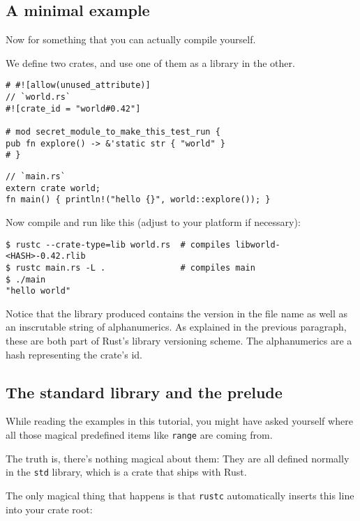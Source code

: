 \documentclass[]{article}
\begin{document}
\subsection{A minimal example}\label{a-minimal-example}

Now for something that you can actually compile yourself.

We define two crates, and use one of them as a library in the other.

\begin{verbatim}
# #![allow(unused_attribute)]
// `world.rs`
#![crate_id = "world#0.42"]

# mod secret_module_to_make_this_test_run {
pub fn explore() -> &'static str { "world" }
# }
\end{verbatim}

\begin{verbatim}
// `main.rs`
extern crate world;
fn main() { println!("hello {}", world::explore()); }
\end{verbatim}

Now compile and run like this (adjust to your platform if necessary):

\begin{verbatim}
$ rustc --crate-type=lib world.rs  # compiles libworld-<HASH>-0.42.rlib
$ rustc main.rs -L .               # compiles main
$ ./main
"hello world"
\end{verbatim}

Notice that the library produced contains the version in the file name
as well as an inscrutable string of alphanumerics. As explained in the
previous paragraph, these are both part of Rust's library versioning
scheme. The alphanumerics are a hash representing the crate's id.

\subsection{The standard library and the
prelude}\label{the-standard-library-and-the-prelude}

While reading the examples in this tutorial, you might have asked
yourself where all those magical predefined items like \texttt{range}
are coming from.

The truth is, there's nothing magical about them: They are all defined
normally in the \texttt{std} library, which is a crate that ships with
Rust.

The only magical thing that happens is that \texttt{rustc} automatically
inserts this line into your crate root:
\end{document}
